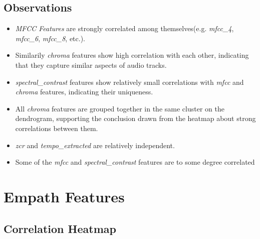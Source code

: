 \subsection*{Observations}
\begin{itemize}
  \item \textit{MFCC Features} are strongly correlated among themselves(e.g.
    \textit{mfcc\_4}, \textit{mfcc\_6}, \textit{mfcc\_8}, etc.).
  \item Similarily \textit{chroma} features show high correlation with each
    other, indicating that they capture similar aspects of audio tracks.
  \item \textit{spectral\_contrast} features show relatively small
    correlations with \textit{mfcc} and  \textit{chroma} features, indicating 
    their uniqueness.
  \item All \textit{chroma} features are grouped together in the same cluster
    on the dendrogram, supporting the conclusion drawn from the heatmap about
    strong correlations between them.
  \item \textit{zcr} and \textit{tempo\_extracted} are relatively independent.
  \item Some of the \textit{mfcc} and \textit{spectral\_contrast} features
    are to some degree correlated
\end{itemize}



\section{Empath Features}

\subsection*{Correlation Heatmap}
\label{sec:correlationheatmapsspotifyfeatures}

